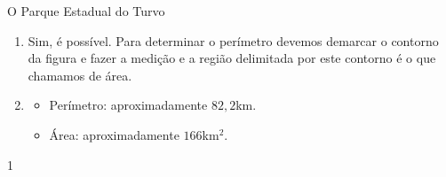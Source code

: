 \clearmargin
\marginpar{\vspace{.5em}}
\begin{answer}{O Parque Estadual do Turvo}
{
  \begin{enumerate}
  \item Sim, é possível. Para determinar o perímetro devemos demarcar o contorno da figura e fazer a medição e a região delimitada por este contorno é o que chamamos de área.
  \item 
  \begin{itemize}
  \item Perímetro: aproximadamente $82{,}2$km.
  \item Área: aproximadamente $166$km$^2$.
  \end{itemize}
  
  \end{enumerate}
}{1}
\end{answer}

